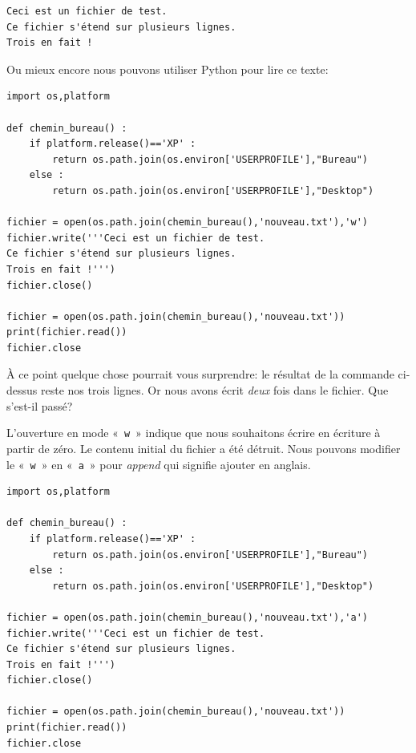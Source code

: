 \begin{Verbatim}[frame=single,rulecolor=\color{gray}, label=contenu de nouveau.txt]
Ceci est un fichier de test.
Ce fichier s'étend sur plusieurs lignes.
Trois en fait !
\end{Verbatim}

Ou mieux encore nous pouvons utiliser Python pour lire ce texte:

\begin{Verbatim}[frame=single,rulecolor=\color{mbleu}, label=à taper par exemple en reprenant l'existant]
import os,platform

def chemin_bureau() :
    if platform.release()=='XP' :
        return os.path.join(os.environ['USERPROFILE'],"Bureau")
    else :
        return os.path.join(os.environ['USERPROFILE'],"Desktop")
    
fichier = open(os.path.join(chemin_bureau(),'nouveau.txt'),'w')
fichier.write('''Ceci est un fichier de test.
Ce fichier s'étend sur plusieurs lignes.
Trois en fait !''')
fichier.close()

fichier = open(os.path.join(chemin_bureau(),'nouveau.txt'))
print(fichier.read())
fichier.close
\end{Verbatim}

À ce point quelque chose pourrait vous surprendre: le résultat de la commande ci-dessus reste nos trois lignes. Or nous avons écrit \emph{deux} fois dans le fichier. Que s'est-il passé?

L'ouverture en mode «~\texttt{w}~» indique que nous souhaitons écrire en écriture à partir de zéro. Le contenu initial du fichier a été détruit. Nous pouvons modifier le «~\texttt{w}~» en «~\texttt{a}~» pour \emph{append} qui signifie ajouter en anglais.

\begin{Verbatim}[frame=single,rulecolor=\color{mbleu}, label=à taper par exemple en reprenant l'existant]
import os,platform

def chemin_bureau() :
    if platform.release()=='XP' :
        return os.path.join(os.environ['USERPROFILE'],"Bureau")
    else :
        return os.path.join(os.environ['USERPROFILE'],"Desktop")
    
fichier = open(os.path.join(chemin_bureau(),'nouveau.txt'),'a')
fichier.write('''Ceci est un fichier de test.
Ce fichier s'étend sur plusieurs lignes.
Trois en fait !''')
fichier.close()

fichier = open(os.path.join(chemin_bureau(),'nouveau.txt'))
print(fichier.read())
fichier.close
\end{Verbatim}

